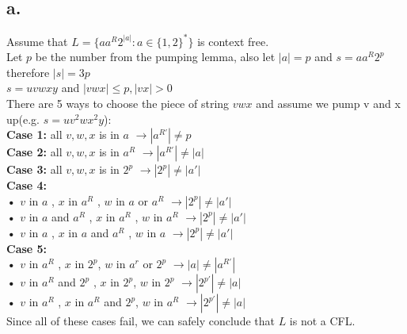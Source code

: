 \documentclass[12pt]{article}
\begin{document}
\subsection*{a.}
Assume that $L=\lbrace aa^R2^{|a|}: a\in {\lbrace 1,2 \rbrace }^* \rbrace $ is context free. \\
Let $p$ be the number from the pumping lemma, also let $|a|=p$ and $s=aa^R2^p$ therefore $|s| = 3p$\\
$s=uvwxy$ and $|vwx|\leq p , |vx|>0 $\\
There are 5 ways to choose the piece of string $vwx$ and assume we pump v and x up(e.g. $s=uv^2wx^2y$):\\
\textbf{Case 1:} all $v,w,x$ is in $a$ $\rightarrow |a^{R'}| \neq p $\\
\textbf{Case 2:} all $v,w,x$ is in $a^R$ $\rightarrow |a^{R'}| \neq |a|  $\\
\textbf{Case 3:} all $v,w,x$ is in $2^p$ $\rightarrow |2^p| \neq |a'| $\\
\textbf{Case 4:}\\
\indent \textbf{•} $v$ in $a$ , $x$ in $a^R$ , $w$ in $a$ or $a^R $ $\rightarrow |2^p| \neq |a'| $\\
\indent \textbf{•} $v$ in $a$ and $a^R$ , $x$ in $a^R$ , $w$ in $a^R $ $\rightarrow |2^p| \neq |a'| $\\
\indent \textbf{•} $v$ in $a$ , $x$ in $a$ and $a^R$ , $w$ in $a  $ $\rightarrow |2^p| \neq |a'| $\\
\textbf{Case 5:}\\
\indent \textbf{•} $v$ in $a^R$ , $x$ in $2^p$, $w$ in $a^r $ or $2^p$ $\rightarrow |a| \neq |a^{R'}| $\\
\indent \textbf{•} $v$ in $a^R$ and $2^p$ , $x$ in $2^p$, $w$ in $2^p$ $\rightarrow |2^{p'}| \neq |a| $\\
\indent \textbf{•} $v$ in $a^R$ , $x$ in $a^R$ and $2^p$, $w$ in $a^R$ $\rightarrow |2^{p'}| \neq |a| $\\
Since all of these cases fail, we can safely conclude that $L$ is not a CFL.
\end{document}
